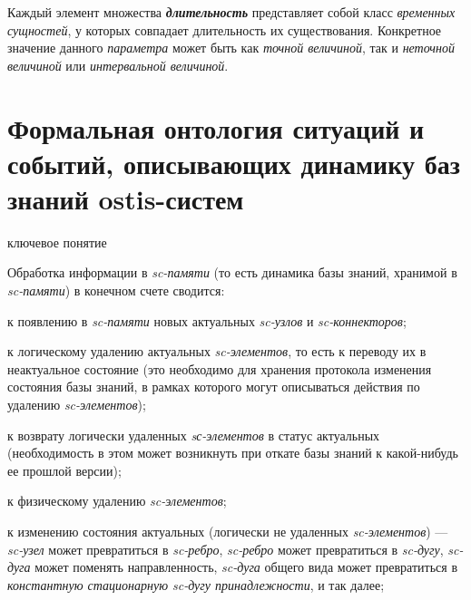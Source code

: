 \begin{SCn}
\begin{SCn}
Каждый элемент множества \textbf{\textit{длительность}} представляет собой класс \textit{временных сущностей}, у которых совпадает длительность их существования. Конкретное значение данного \textit{параметра} может быть как \textit{точной величиной}, так и \textit{неточной величиной} или \textit{интервальной величиной}.
		
\section{Формальная онтология ситуаций и событий, описывающих динамику баз знаний ostis-систем}
\label{sec_top_ontologies_dynamic}

\begin{SCn}
\begin{scnrelfromlist}{ключевое понятие}
\end{scnrelfromlist}
\end{SCn}	

Обработка информации в \textit{sc-памяти} (то есть динамика базы знаний, хранимой в \textit{sc-памяти}) в конечном счете сводится:
\begin{textitemize}
	\item к появлению в \textit{sc-памяти} новых актуальных \textit{sc-узлов} и \textit{sc-коннекторов};
	\item к логическому удалению актуальных \textit{sc-элементов}, то есть к переводу их в неактуальное состояние (это необходимо для хранения протокола изменения состояния базы знаний, в рамках которого могут описываться действия по удалению \textit{sc-элементов});
	\item к возврату логически удаленных \textit{sс-элементов} в статус актуальных (необходимость в этом может возникнуть при откате базы знаний к какой-нибудь ее прошлой версии);
	\item к физическому удалению \textit{sc-элементов};
	\item к изменению состояния актуальных (логически не удаленных \textit{sc-элементов}) --- \textit{sc-узел} может превратиться в \textit{sc-ребро}, \textit{sc-ребро} может превратиться в \textit{sc-дугу}, \textit{sc-дуга} может поменять направленность, \textit{sc-дуга} общего вида может превратиться в \textit{константную стационарную sc-дугу принадлежности}, и так далее;
\end{textitemize}


\end{SCn}
\end{SCn}
